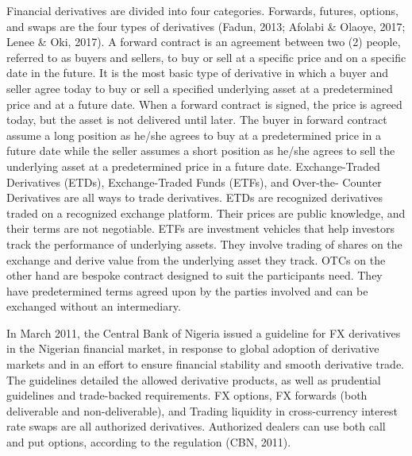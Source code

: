\documentclass[a4 paper, 12pt]{report}
\theoremstyle{plain}
\begin{document}
\par Financial derivatives are divided into four categories. Forwards, futures, options,
and swaps are the four types of derivatives (Fadun, 2013; Afolabi \& Olaoye, 2017; Lenee
\& Oki, 2017). A forward contract is an agreement between two (2) people, referred to as
buyers and sellers, to buy or sell at a specific price and on a specific date in the future. It
is the most basic type of derivative in which a buyer and seller agree today to buy or sell
a specified underlying asset at a predetermined price and at a future date. When a
forward contract is signed, the price is agreed today, but the asset is not delivered until
later. The buyer in forward contract assume a long position as he/she agrees to buy at a
predetermined price in a future date while the seller assumes a short position as he/she
agrees to sell the underlying asset at a predetermined price in a future date.
Exchange-Traded Derivatives (ETDs), Exchange-Traded Funds (ETFs), and Over-the-
Counter Derivatives are all ways to trade derivatives. ETDs are recognized derivatives
traded on a recognized exchange platform. Their prices are public knowledge, and their
terms are not negotiable. ETFs are investment vehicles that help investors track the
performance of underlying assets. They involve trading of shares on the exchange and
derive value from the underlying asset they track. OTCs on the other hand are bespoke
contract designed to suit the participants need. They have predetermined terms agreed
upon by the parties involved and can be exchanged without an intermediary.\\
\par In March 2011, the Central Bank of Nigeria issued a guideline for FX derivatives in
the Nigerian financial market, in response to global adoption of derivative markets and in
an effort to ensure financial stability and smooth derivative trade. The guidelines detailed
the allowed derivative products, as well as prudential guidelines and trade-backed
requirements. FX options, FX forwards (both deliverable and non-deliverable), and
Trading liquidity in cross-currency interest rate swaps are all authorized derivatives.
Authorized dealers can use both call and put options, according to the regulation (CBN, 2011).\\
\end{document}

